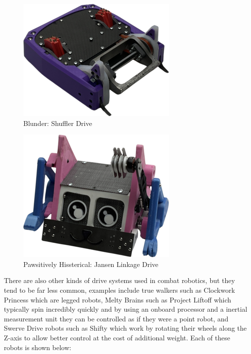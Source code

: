 \documentclass[conference]{IEEEtran}
\begin{document}
\begin{figure}[htp]
\centering
\includegraphics[scale=0.4]{blunder.png}
\caption{Blunder: Shuffler Drive}
\label{Blunder: Shuffler Drive}
\end{figure}

\begin{figure}[htp]
\centering
\includegraphics[scale=0.4]{pawsitivelyhissterical.png}
\caption{Pawsitively Hissterical: Jansen Linkage Drive \cite{b2}}
\label{Pawsitively Hissterical: Jansen Linkage Drive}
\end{figure}

There are also other kinds of drive systems used in combat robotics, but they tend to be far less common, examples include true walkers such as Clockwork Princess which are legged robots, Melty Brains such as Project Liftoff which typically spin incredibly quickly and by using an onboard processor and a inertial measurement unit they can be controlled as if they were a point robot, and Swerve Drive robots such as Shifty which work by rotating their wheels along the Z-axis to allow better control at the cost of additional weight.  Each of these robots is shown below:
\end{document}
